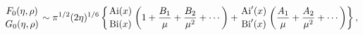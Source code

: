 \[{\mathop{F_{0}\/}\nolimits\!\left(\eta,\rho\right)\atop\mathop{G_{0}\/}%
\nolimits\!\left(\eta,\rho\right)}\sim\pi^{1/2}(2\eta)^{1/6}\left\{{\mathop{%
\mathrm{Ai}\/}\nolimits\!\left(x\right)\atop\mathop{\mathrm{Bi}\/}\nolimits\!%
\left(x\right)}\left(1+\frac{B_{1}}{\mu}+\frac{B_{2}}{\mu^{2}}+\cdots\right)+{%
\mathop{\mathrm{Ai}\/}\nolimits'\!\left(x\right)\atop\mathop{\mathrm{Bi}\/}%
\nolimits'\!\left(x\right)}\left(\frac{A_{1}}{\mu}+\frac{A_{2}}{\mu^{2}}+%
\cdots\right)\right\},\]